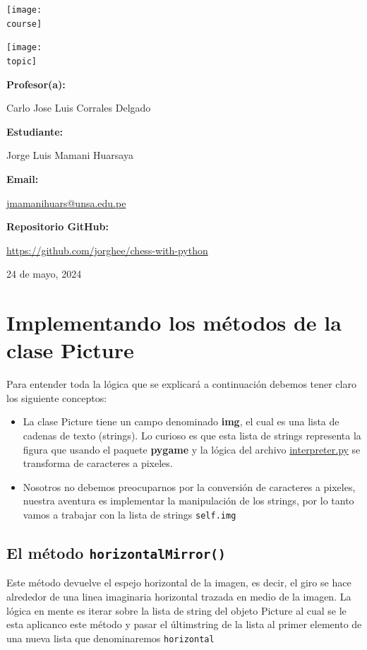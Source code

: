 \documentclass[10pt, a4paper]{article}
\makeatletter
\newcommand{\mintpython}[1]{\texttt{#1}}
\newcommand{\course}{img/web_programming.png}
\newcommand{\topic}{img/python.png}
\newcommand{\professor}{Carlo Jose Luis Corrales Delgado}
\newcommand{\student}{Jorge Luis Mamani Huarsaya}
\newcommand{\email}{https://mail.google.com/mail/u/0/?fs=1&tf=cm&source=mailto&to=jmamanihuars@unsa.edu.pe}
\newcommand{\github}{https://github.com/jorghee/chess-with-python}
\newcommand{\mydate}{24 de mayo, 2024}
\makeatother
\begin{document}
\begin{titlepage}
	\centering
	\texttt{[image: \\course]} \par
  \vfill \vfill
	\texttt{[image: \\topic]}\par
  \vfill \vfill
  {\textbf{Profesor(a):} \par}
	\professor \vfill
  {\textbf{Estudiante:} \par}
	\student \vfill
  {\textbf{Email:} \par}
  \href{\email}{jmamanihuars@unsa.edu.pe} \vfill
  {\textbf{Repositorio GitHub:} \par}
  \href{\github}{\github} \vfill
	{\large \mydate \par}
\end{titlepage}

\section{Implementando los métodos de la clase Picture}
Para entender toda la lógica que se explicará a continuación debemos tener claro los siguiente conceptos:

\begin{itemize}
  \item La clase Picture tiene un campo denominado \textbf{img}, el cual es una lista de cadenas de texto (strings). Lo curioso es que esta lista de strings representa la figura que usando el paquete \textbf{pygame} y la lógica del archivo \href{https://github.com/jorghee/chess-with-python/blob/main/interpreter.py}{interpreter.py} se transforma de caracteres a pixeles.
  \item Nosotros no debemos preocuparnos por la conversión de caracteres a pixeles, nuestra aventura es implementar la manipulación de los strings, por lo tanto vamos a trabajar con la lista de strings \mintpython{self.img}
\end{itemize}

\subsection{El método \mintpython{horizontalMirror()}}
Este método devuelve el espejo horizontal de la imagen, es decir, el giro se hace alrededor de una linea imaginaria horizontal trazada en medio de la imagen. 
\singlespacing
La lógica en mente es iterar sobre la lista de string del objeto Picture al cual se le esta aplicanco este método y pasar el últimstring de la lista al primer elemento de una nueva lista que denominaremos \mintpython{horizontal}
\end{document}
